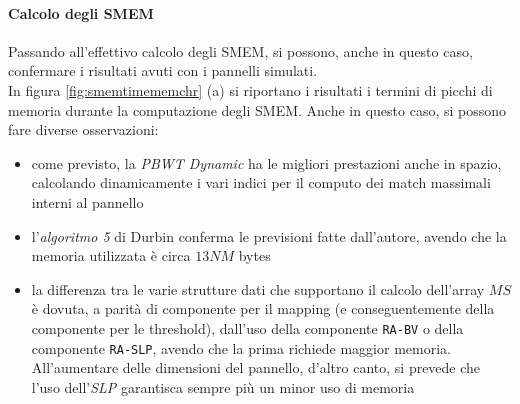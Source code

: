 \paragraph{Calcolo degli SMEM}
Passando all'effettivo calcolo degli SMEM, si possono, anche in questo caso,
confermare i risultati avuti con i pannelli simulati.\\
In figura \ref{fig:smemtimememchr} (a) si riportano i risultati i termini di
picchi di 
memoria durante la computazione degli SMEM. Anche in questo caso, si possono fare
diverse osservazioni:
\begin{itemize}
  \item come previsto, la \textit{PBWT Dynamic} ha le migliori prestazioni anche
  in spazio, calcolando dinamicamente i vari indici per il computo dei match
  massimali interni al pannello
  \item l'\textit{algoritmo 5} di Durbin conferma le previsioni fatte
  dall'autore, avendo che la memoria utilizzata è circa $13NM$ bytes
  \item la differenza tra le varie strutture dati che supportano il calcolo
  dell'array $MS$ è dovuta, a parità di componente per il mapping (e
  conseguentemente della componente per le threshold), dall'uso della componente
  \texttt{RA-BV} o della componente \texttt{RA-SLP}, avendo che la prima
  richiede maggior memoria. All'aumentare delle dimensioni del
  pannello, d'altro canto, si prevede che l'uso dell'\textit{SLP} garantisca
  sempre più un minor uso di memoria
\end{itemize}
